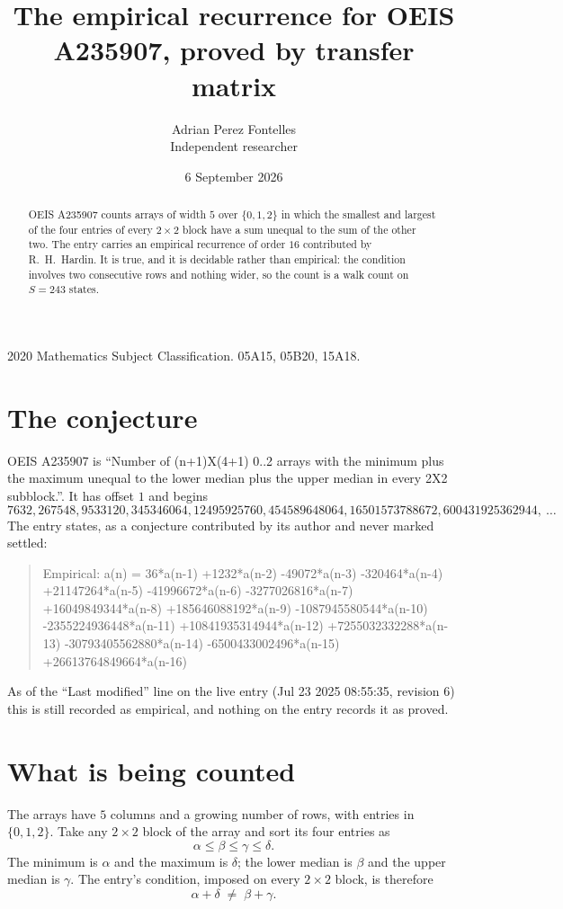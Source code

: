 \documentclass[11pt,a4paper]{article}
\title{The empirical recurrence for OEIS A235907, proved by transfer matrix}
\author{Adrian Perez Fontelles\\ \small Independent researcher}
\date{6 September 2026}
\theoremstyle{plain}
\theoremstyle{definition}
\begin{document}
\maketitle

\begin{abstract}
OEIS A235907 counts arrays of width $5$ over $\{0,1,2\}$ in which the smallest and largest of the
four entries of every $2\times2$ block have a sum unequal to the sum of the other two. The entry
carries an empirical recurrence of order $16$ contributed by R.~H.~Hardin. It is true, and
it is decidable rather than empirical: the condition involves two consecutive rows and nothing
wider, so the count is a walk count on $S=243$ states.
\end{abstract}

\noindent\small 2020 Mathematics Subject Classification. 05A15, 05B20, 15A18.\normalsize

\section{The conjecture}

OEIS A235907 is ``Number of (n+1)X(4+1) 0..2 arrays with the minimum plus the maximum unequal to the lower median plus the upper median in every 2X2 subblock.''. It has offset $1$ and begins
\[
7632, 267548, 9533120, 345346064, 12495925760, 454589648064, 16501573788672, 600431925362944,\ \dots
\]
The entry states, as a conjecture contributed by its author and never marked settled:
\begin{quote}
Empirical: a(n) = 36*a(n-1) +1232*a(n-2) -49072*a(n-3) -320464*a(n-4) +21147264*a(n-5) -41996672*a(n-6) -3277026816*a(n-7) +16049849344*a(n-8) +185646088192*a(n-9) -1087945580544*a(n-10) -2355224936448*a(n-11) +10841935314944*a(n-12) +7255032332288*a(n-13) -30793405562880*a(n-14) -6500433002496*a(n-15) +26613764849664*a(n-16)
\end{quote}
As of the ``Last modified'' line on the live entry (Jul 23 2025 08:55:35, revision 6) this is still
recorded as empirical, and nothing on the entry records it as proved.

\section{What is being counted}

The arrays have $5$ columns and a growing number of rows, with entries in $\{0,1,2\}$. Take any
$2\times2$ block of the array and sort its four entries as
\[
\alpha\le\beta\le\gamma\le\delta .
\]
The minimum is $\alpha$ and the maximum is $\delta$; the lower median is $\beta$ and the upper
median is $\gamma$. The entry's condition, imposed on every $2\times2$ block, is therefore
\[
\alpha+\delta\;\neq\;\beta+\gamma .
\]
\end{document}
